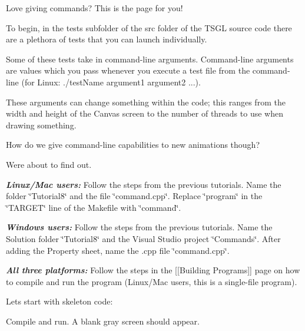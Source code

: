 Love giving commands? This is the page for you!

To begin, in the {\ttfamily tests} subfolder of the {\ttfamily src} folder of the T\+S\+GL source code there are a plethora of tests that you can launch individually.

Some of these tests take in command-\/line arguments. Command-\/line arguments are values which you pass whenever you execute a test file from the command-\/line (for Linux\+: ./test\+Name argument1 argument2 ...).

These arguments can change something within the code; this ranges from the width and height of the Canvas screen to the number of threads to use when drawing something.

How do we give command-\/line capabilities to new animations though?

We\textquotesingle{}re about to find out.

{\itshape {\bfseries{Linux/\+Mac users\+:}}} Follow the steps from the previous tutorials. Name the folder \char`\"{}\+Tutorial8\char`\"{} and the file \char`\"{}command.\+cpp\char`\"{}. Replace \char`\"{}program\char`\"{} in the \char`\"{}\+T\+A\+R\+G\+E\+T\char`\"{} line of the Makefile with \char`\"{}command\char`\"{}.

{\itshape {\bfseries{Windows users\+:}}} Follow the steps from the previous tutorials. Name the Solution folder \char`\"{}\+Tutorial8\char`\"{} and the Visual Studio project \char`\"{}\+Commands\char`\"{}. After adding the Property sheet, name the .cpp file \char`\"{}command.\+cpp\char`\"{}.

{\itshape {\bfseries{All three platforms\+:}}} Follow the steps in the \mbox{[}\mbox{[}Building Programs\mbox{]}\mbox{]} page on how to compile and run the program (Linux/\+Mac users, this is a single-\/file program).

Let\textquotesingle{}s start with skeleton code\+:


\begin{DoxyCode}{0}
\DoxyCodeLine{\textcolor{preprocessor}{\#include <tsgl.h>}}
\DoxyCodeLine{}
\DoxyCodeLine{\}}
\end{DoxyCode}


Compile and run. A blank gray screen should appear.

